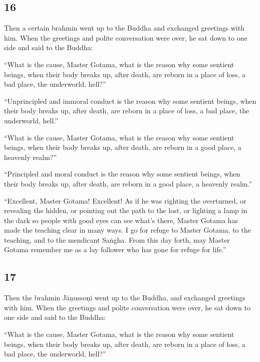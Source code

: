 \documentclass[12pt,openany]{book}%
\begin{document}
\subsection*{16 }

Then a certain brahmin went up to the Buddha and exchanged greetings with him. When the greetings and polite conversation were over, he sat down to one side and said to the Buddha: 

“What is the cause, Master Gotama, what is the reason why some sentient beings, when their body breaks up, after death, are reborn in a place of loss, a bad place, the underworld, hell?” 

“Unprincipled and immoral conduct is the reason why some sentient beings, when their body breaks up, after death, are reborn in a place of loss, a bad place, the underworld, hell.” 

“What is the cause, Master Gotama, what is the reason why some sentient beings, when their body breaks up, after death, are reborn in a good place, a heavenly realm?” 

“Principled and moral conduct is the reason why some sentient beings, when their body breaks up, after death, are reborn in a good place, a heavenly realm.” 

“Excellent, Master Gotama! Excellent! As if he was righting the overturned, or revealing the hidden, or pointing out the path to the lost, or lighting a lamp in the dark so people with good eyes can see what’s there, Master Gotama has made the teaching clear in many ways. I go for refuge to Master Gotama, to the teaching, and to the mendicant \textsanskrit{Saṅgha}. From this day forth, may Master Gotama remember me as a lay follower who has gone for refuge for life.” 

\subsection*{17 }

Then the brahmin \textsanskrit{Jāṇussoṇi} went up to the Buddha, and exchanged greetings with him. When the greetings and polite conversation were over, he sat down to one side and said to the Buddha: 

“What is the cause, Master Gotama, what is the reason why some sentient beings, when their body breaks up, after death, are reborn in a place of loss, a bad place, the underworld, hell?” 
\end{document}

